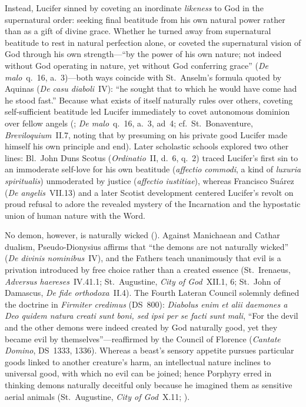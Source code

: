 Instead, Lucifer sinned by coveting an inordinate \emph{likeness} to God in the supernatural order: seeking final beatitude from his own natural power rather than as a gift of divine grace. Whether he turned away from supernatural beatitude to rest in natural perfection alone, or coveted the supernatural vision of God through his own strength---``by the power of his own nature; not indeed without God operating in nature, yet without God conferring grace'' (\emph{De malo}~q.~16, a.~3)---both ways coincide with St.~Anselm's formula quoted by Aquinas (\emph{De casu diaboli}~IV): ``he sought that to which he would have come had he stood fast.'' Because what exists of itself naturally rules over others, coveting self-sufficient beatitude led Lucifer immediately to covet autonomous dominion over fellow angels (; \emph{De malo}~q.~16, a.~3, ad~4; cf.~St.~Bonaventure, \emph{Breviloquium}~II.7, noting that by presuming on his private good Lucifer made himself his own principle and end). Later scholastic schools explored two other lines: Bl.~John Duns Scotus (\emph{Ordinatio}~II, d.~6, q.~2) traced Lucifer's first sin to an immoderate self-love for his own beatitude (\emph{affectio commodi}, a kind of \emph{luxuria spiritualis}) unmoderated by justice (\emph{affectio iustitiae}), whereas Francisco Su\'arez (\emph{De angelis}~VII.13) and a later Scotist development centered Lucifer's revolt on proud refusal to adore the revealed mystery of the Incarnation and the hypostatic union of human nature with the Word.

No demon, however, is naturally wicked (). Against Manichaean and Cathar dualism, Pseudo-Dionysius affirms that ``the demons are not naturally wicked'' (\emph{De divinis nominibus}~IV), and the Fathers teach unanimously that evil is a privation introduced by free choice rather than a created essence (St.~Irenaeus, \emph{Adversus haereses}~IV.41.1; St.~Augustine, \emph{City of God}~XII.1, 6; St.~John of Damascus, \emph{De fide orthodoxa}~II.4). The Fourth Lateran Council solemnly defined the doctrine in \emph{Firmiter credimus} (DS~800): \emph{Diabolus enim et alii daemones a Deo quidem natura creati sunt boni, sed ipsi per se facti sunt mali}, ``For the devil and the other demons were indeed created by God naturally good, yet they became evil by themselves''---reaffirmed by the Council of Florence (\emph{Cantate Domino}, DS~1333, 1336). Whereas a beast's sensory appetite pursues particular goods linked to another creature's harm, an intellectual nature inclines to universal good, with which no evil can be joined; hence Porphyry erred in thinking demons naturally deceitful only because he imagined them as sensitive aerial animals (St.~Augustine, \emph{City of God}~X.11; ).

